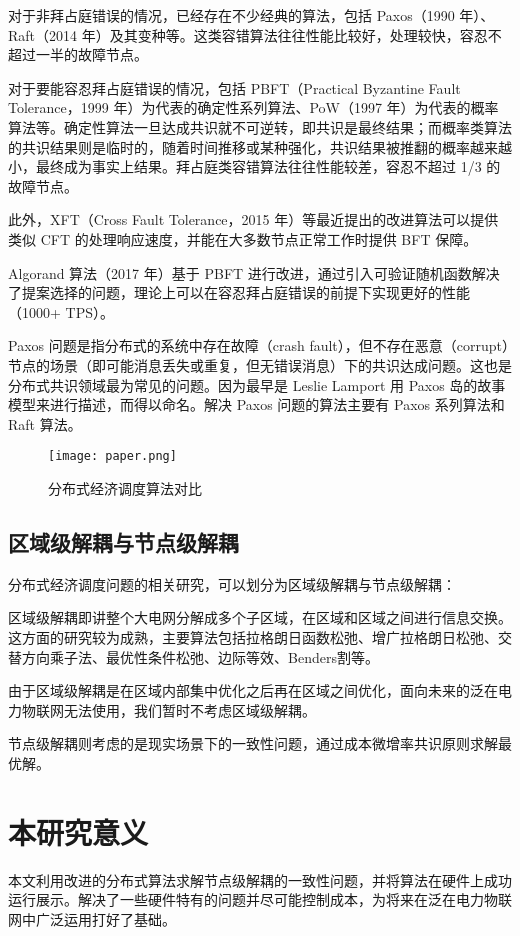 对于非拜占庭错误的情况，已经存在不少经典的算法，包括 Paxos（1990 年）、Raft（2014 年）及其变种等。这类容错算法往往性能比较好，处理较快，容忍不超过一半的故障节点。

对于要能容忍拜占庭错误的情况，包括 PBFT（Practical Byzantine Fault Tolerance，1999 年）为代表的确定性系列算法、PoW（1997 年）为代表的概率算法等。确定性算法一旦达成共识就不可逆转，即共识是最终结果；而概率类算法的共识结果则是临时的，随着时间推移或某种强化，共识结果被推翻的概率越来越小，最终成为事实上结果。拜占庭类容错算法往往性能较差，容忍不超过 1/3 的故障节点。

此外，XFT（Cross Fault Tolerance，2015 年）等最近提出的改进算法可以提供类似 CFT 的处理响应速度，并能在大多数节点正常工作时提供 BFT 保障。

Algorand 算法（2017 年）基于 PBFT 进行改进，通过引入可验证随机函数解决了提案选择的问题，理论上可以在容忍拜占庭错误的前提下实现更好的性能（1000+ TPS）。

Paxos 问题是指分布式的系统中存在故障（crash fault），但不存在恶意（corrupt）节点的场景（即可能消息丢失或重复，但无错误消息）下的共识达成问题。这也是分布式共识领域最为常见的问题。因为最早是 Leslie Lamport 用 Paxos 岛的故事模型来进行描述，而得以命名。解决 Paxos 问题的算法主要有 Paxos 系列算法和 Raft 算法。

\begin{figure}[htbp] %
    \centering
    \texttt{[image: paper.png]}
    \caption{分布式经济调度算法对比}
    \label{fig:CompareAlgorithm}
\end{figure}

\subsection{区域级解耦与节点级解耦}

分布式经济调度问题的相关研究，可以划分为区域级解耦与节点级解耦：

区域级解耦即讲整个大电网分解成多个子区域，在区域和区域之间进行信息交换。这方面的研究较为成熟，主要算法包括拉格朗日函数松弛、增广拉格朗日松弛、交替方向乘子法、最优性条件松弛、边际等效、Benders割等。

由于区域级解耦是在区域内部集中优化之后再在区域之间优化，面向未来的泛在电力物联网无法使用，我们暂时不考虑区域级解耦。

节点级解耦则考虑的是现实场景下的一致性问题，通过成本微增率共识原则求解最优解。

\section{本研究意义}

本文利用改进的分布式算法求解节点级解耦的一致性问题，并将算法在硬件上成功运行展示。解决了一些硬件特有的问题并尽可能控制成本，为将来在泛在电力物联网中广泛运用打好了基础。